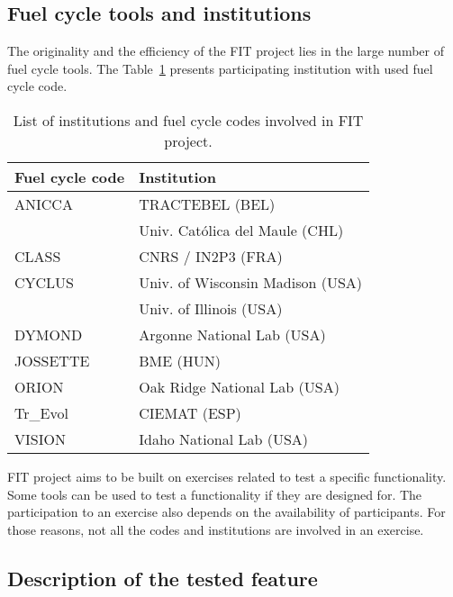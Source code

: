 \subsection{Fuel cycle tools and institutions}

The originality and the efficiency of the FIT project lies in the large number of fuel cycle tools. The Table~\ref{Tab:Code} presents participating institution with used fuel cycle code.

\begin{table}[h]
\centering
\begin{tabular}{ |l|l| }
  \hline
  Fuel cycle code & Institution \\
  \hline
  ANICCA\cite{} & TRACTEBEL (BEL) \\
   & Univ. Católica del Maule (CHL) \\
  \hline
  CLASS\cite{Thiolliere_2018} & CNRS / IN2P3 (FRA) \\
  \hline
  CYCLUS\cite{} & Univ. of Wisconsin Madison (USA) \\
  & Univ. of Illinois (USA) \\
  \hline
  DYMOND\cite{} & Argonne National Lab (USA) \\
  \hline
  JOSSETTE\cite{} & BME (HUN) \\
  \hline
  ORION\cite{} & Oak Ridge National Lab (USA) \\
  \hline
  Tr\_Evol\cite{} & CIEMAT (ESP) \\
  \hline
  VISION\cite{jacobson2009vision} & Idaho National Lab (USA) \\
  \hline
\end{tabular}
\label{Tab:Code}
\caption{List of institutions and fuel cycle codes involved in FIT project.}
\end{table}

FIT project aims to be built on exercises related to test a specific functionality. Some tools can be used to test a functionality if they are designed for. The participation to an exercise also depends on the availability of participants. For those reasons, not all the codes and institutions are involved in an exercise.

\subsection{Description of the tested feature}

